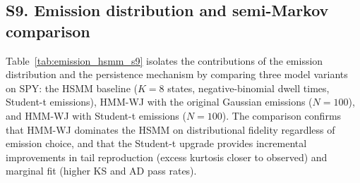 \clearpage

\subsection*{S9. Emission distribution and semi-Markov comparison}

Table~\ref{tab:emission_hsmm_s9} isolates the contributions of the emission distribution and the persistence mechanism by comparing three model variants on SPY: the HSMM baseline ($K=8$ states, negative-binomial dwell times, Student-t emissions), HMM-WJ with the original Gaussian emissions ($N=100$), and HMM-WJ with Student-t emissions ($N=100$). The comparison confirms that HMM-WJ dominates the HSMM on distributional fidelity regardless of emission choice, and that the Student-t upgrade provides incremental improvements in tail reproduction (excess kurtosis closer to observed) and marginal fit (higher KS and AD pass rates).

